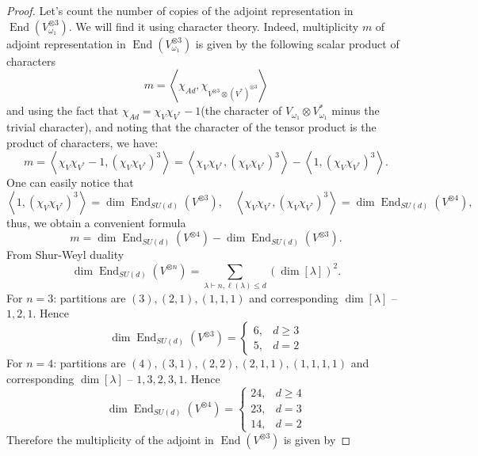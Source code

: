 \documentclass[10pt,twocolumn,superscriptaddress,aps,amsmath,amssymb,citeautoscript,floatfix,prx]{revtex4-2}
\theoremstyle{plain}
\theoremstyle{plain}
\theoremstyle{plain}
\theoremstyle{plain}
\theoremstyle{plain}
\theoremstyle{plain}
\theoremstyle{plain}
\theoremstyle{definition}
\theoremstyle{plain}
\begin{document}
\begin{appendix}
\begin{proof}
    Let's count the number of copies of the adjoint representation in $\operatorname{End}(V_{\omega_1}^{\otimes 3})$. We will 
    find it using character theory. Indeed, multiplicity $m$ of adjoint representation in $\operatorname{End}(V_{\omega_1}^{\otimes 3})$ is given by the following scalar product of characters
    \[
        m=\left\langle\chi_{A d}, \chi_{V^{\otimes 3} \otimes\left(V^*\right)^{\otimes 3}}\right\rangle
    \]
    and using the fact that $\chi_{Ad}=\chi_V \chi_{V^*}-1$(the character of $V_{\omega_1} \otimes V_{\omega_1}^*$ minus the trivial character), and noting that the character of the tensor product is the product of characters, we have:
    \[
        m=\left\langle\chi_V \chi_{V^*}-1,\left(\chi_V \chi_{V^*}\right)^3\right\rangle=\left\langle \chi_V \chi_{V^*},\left(\chi_V \chi_{V^*}\right)^3\right\rangle-\left\langle 1, \left(\chi_V \chi_{V^*}\right)^3\right\rangle.
    \]
    One can easily notice that
    \[
        \left\langle 1, \left(\chi_V \chi_{V^*}\right)^3\right\rangle=\operatorname{dim} \operatorname{End}_{S U(d)}\left(V^{\otimes 3}\right), \quad \left\langle \chi_V \chi_{V^*},\left(\chi_V \chi_{V^*}\right)^3\right\rangle=\operatorname{dim} \operatorname{End}_{S U(d)}\left(V^{\otimes 4}\right),
    \]
    thus, we obtain a convenient formula 
    \[
        m=\operatorname{dim} \operatorname{End}_{S U(d)}\left(V^{\otimes 4}\right)-\operatorname{dim} \operatorname{End}_{S U(d)}\left(V^{\otimes 3}\right).
    \]
    From Shur-Weyl duality
    \[
        \operatorname{dim} \operatorname{End}_{S U(d)}\left(V^{\otimes n}\right)=\sum_{\lambda \vdash n, \ell(\lambda) \leq d}\left(\operatorname{dim}[\lambda]\right)^2.
    \]
    For $n=3$: partitions are $(3),(2,1),(1,1,1)$ and corresponding $\operatorname{dim}[\lambda]$ -- $1,2,1$.
    Hence
    $$
    \operatorname{dim} \operatorname{End}_{S U(d)}\left(V^{\otimes 3}\right)= \begin{cases}6, & d \geq 3 \\ 5, & d=2\end{cases}
    $$
    For $n=4$: partitions are $(4),(3,1),(2,2),(2,1,1),(1,1,1,1)$ and corresponding $\operatorname{dim}[\lambda]$ -- $1,3,2,3,1$.
    Hence
    $$
    \operatorname{dim} \operatorname{End}_{S U(d)}\left(V^{\otimes 4}\right)= \begin{cases}24, & d \geq 4 \\ 23, & d=3 \\ 14, & d=2\end{cases}
    $$
    Therefore the multiplicity of the adjoint in $\operatorname{End}\left(V^{\otimes 3}\right)$ is given by

\end{proof}
\end{appendix}
\end{document}
